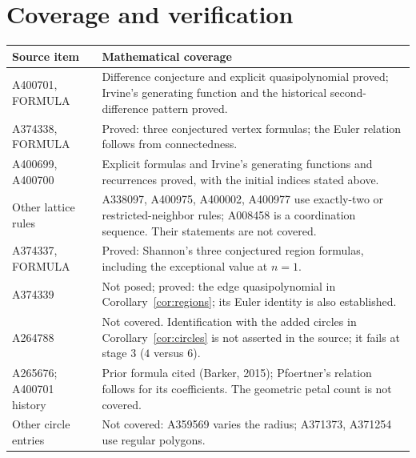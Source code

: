 \documentclass[11pt]{article}
\begin{document}
\section{Coverage and verification}
\begin{center}\small
\begin{tabular}{p{.26\linewidth}p{.64\linewidth}}
\toprule
Source item & Mathematical coverage\\
\midrule
A400701, FORMULA & Difference conjecture and explicit quasipolynomial proved;
Irvine's generating function and the historical second-difference pattern proved.\\
A374338, FORMULA & Proved: three conjectured vertex formulas;
the Euler relation follows from connectedness.\\
A400699, A400700 & Explicit formulas and Irvine's generating functions and
recurrences proved, with the initial indices stated above.\\
Other lattice rules & A338097, A400975, A400002, A400977 use exactly-two
or restricted-neighbor rules; A008458 is a coordination sequence.
Their statements are not covered.\\
A374337, FORMULA & Proved: Shannon's three conjectured region formulas,
including the exceptional value at $n=1$.\\
A374339 & Not posed; proved: the edge quasipolynomial in
Corollary~\ref{cor:regions}; its Euler identity is also established.\\
A264788 & Not covered. Identification with the added circles in
Corollary~\ref{cor:circles} is not asserted in the source;
it fails at stage $3$ ($4$ versus $6$).\\
A265676; A400701 history & Prior formula cited (Barker, 2015);
Pfoertner's relation follows for its coefficients.
The geometric petal count is not covered.\\
Other circle entries & Not covered: A359569 varies the radius;
A371373, A371254 use regular polygons.\\
\bottomrule
\end{tabular}
\end{center}
\end{document}
